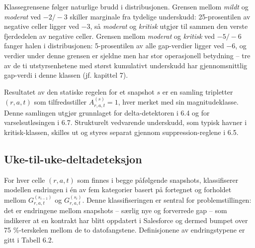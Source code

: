 \documentclass[a4paper,11pt]{article}
\begin{document}
Klassegrensene følger naturlige brudd i distribusjonen. Grensen mellom \textit{mildt} og \textit{moderat} ved $-2/-3$ skiller marginale fra tydelige underskudd: 25-prosentilen av negative celler ligger ved $-3$, så \textit{moderat} og \textit{kritisk} utgjør til sammen den verste fjerdedelen av negative celler. Grensen mellom \textit{moderat} og \textit{kritisk} ved $-5/-6$ fanger halen i distribusjonen: 5-prosentilen av alle gap-verdier ligger ved $-6$, og verdier under denne grensen er sjeldne men har stor operasjonell betydning – tre av de ti utstyrsenhetene med størst kumulativt underskudd har gjennomsnittlig gap-verdi i denne klassen (jf. kapittel 7).

Resultatet av den statiske regelen for et snapshot $s$ er en samling tripletter $(r, a, t)$ som tilfredsstiller $A_{r,a,t}^{(s)} = 1$, hver merket med sin magnitudeklasse. Denne samlingen utgjør grunnlaget for delta-detektoren i 6.4 og for varselsutløsingen i 6.7. Strukturelt vedvarende underskudd, som typisk havner i kritisk-klassen, skilles ut og styres separat gjennom suppression-reglene i 6.5.

\subsection{Uke-til-uke-deltadeteksjon}

For hver celle $(r, a, t)$ som finnes i begge påfølgende snapshots, klassifiserer modellen endringen i én av fem kategorier basert på fortegnet og forholdet mellom $G_{r,a,t}^{(s_{i-1})}$ og $G_{r,a,t}^{(s_i)}$. Denne klassifiseringen er sentral for problemstillingen: det er endringene mellom snapshots – særlig nye og forverrede gap – som indikerer at en kontrakt har blitt oppdatert i Salesforce og dermed bumpet over 75 \%-terskelen mellom de to datofangstene. Definisjonene av endringstypene er gitt i Tabell 6.2.
\end{document}
